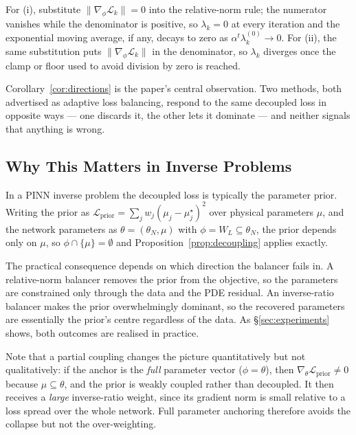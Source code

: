 \documentclass[a4paper,fleqn]{cas-sc}
\begin{document}
\begin{pf}
For (i), substitute $\|\nabla_\phi \mathcal{L}_k\| = 0$ into the relative-norm
rule; the numerator vanishes while the denominator is positive, so
$\lambda_k = 0$ at every iteration and the exponential moving average, if any,
decays to zero as $\alpha^t \lambda_k^{(0)} \to 0$. For (ii), the same
substitution puts $\|\nabla_\phi \mathcal{L}_k\|$ in the denominator, so
$\lambda_k$ diverges once the clamp or floor used to avoid division by zero is
reached.
\end{pf}

Corollary~\ref{cor:directions} is the paper's central observation. Two methods,
both advertised as adaptive loss balancing, respond to the same decoupled loss
in opposite ways --- one discards it, the other lets it dominate --- and neither
signals that anything is wrong.

\subsection{Why This Matters in Inverse Problems}

In a PINN inverse problem the decoupled loss is typically the parameter prior.
Writing the prior as $\mathcal{L}_{\text{prior}} = \sum_j w_j(\mu_j -
\mu_j^\star)^2$ over physical parameters $\mu$, and the network parameters as
$\theta = (\theta_N, \mu)$ with $\phi = W_L \subseteq \theta_N$, the prior
depends only on $\mu$, so $\phi \cap \{\mu\} = \emptyset$ and
Proposition~\ref{prop:decoupling} applies exactly.

The practical consequence depends on which direction the balancer fails in.
A relative-norm balancer removes the prior from the objective, so the
parameters are constrained only through the data and the PDE residual. An
inverse-ratio balancer makes the prior overwhelmingly dominant, so the
recovered parameters are essentially the prior's centre regardless of the
data. As \S\ref{sec:experiments} shows, both outcomes are realised in practice.

Note that a partial coupling changes the picture quantitatively but not
qualitatively: if the anchor is the \emph{full} parameter vector
($\phi = \theta$), then $\nabla_\theta \mathcal{L}_{\text{prior}} \neq 0$
because $\mu \subseteq \theta$, and the prior is weakly coupled rather than
decoupled. It then receives a \emph{large} inverse-ratio weight, since its
gradient norm is small relative to a loss spread over the whole network. Full
parameter anchoring therefore avoids the collapse but not the over-weighting.
\end{document}
